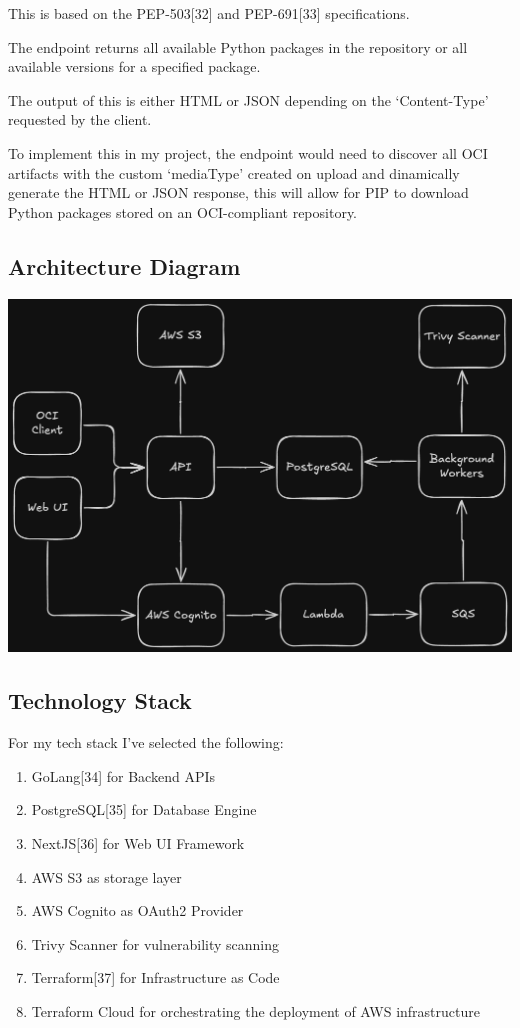 \documentclass{article}
\begin{document}
  This is based on the PEP-503[32] and PEP-691[33] specifications.

  The endpoint returns all available Python packages in the repository or all available versions for a specified package.

  The output of this is either HTML or JSON depending on the `Content-Type' requested by the client.

  To implement this in my project, the endpoint would need to discover all OCI artifacts with the custom `mediaType' created on upload and dinamically generate the HTML or JSON response, this will allow for PIP to download Python packages stored on an OCI-compliant repository.

  \subsection{Architecture Diagram}

  \includegraphics[scale=0.25]{architecture.png}

  \subsection{Technology Stack}

  For my tech stack I've selected the following:
  \begin{enumerate}
    \item GoLang[34] for Backend APIs
    \item PostgreSQL[35] for Database Engine
    \item NextJS[36] for Web UI Framework
    \item AWS S3 as storage layer
    \item AWS Cognito as OAuth2 Provider
    \item Trivy Scanner for vulnerability scanning
    \item Terraform[37] for Infrastructure as Code
    \item Terraform Cloud for orchestrating the deployment of AWS infrastructure
  \end{enumerate}
\end{document}
